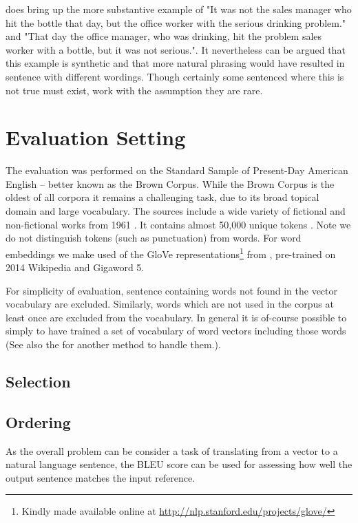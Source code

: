 \documentclass[11pt]{article}
\numberwithin{equation}{section}
\numberwithin{figure}{section}
\theoremstyle{plain}
\theoremstyle{definition}
\begin{document}
\textcite{Mitchell2008} does bring up the more substantive example of  "It was not the sales manager who  hit  the bottle that day, but the office worker with the serious drinking problem." and "That day the office manager,   who was drinking, hit the problem sales worker with a bottle, but it was not serious.". It nevertheless can be argued that this example is synthetic and that more natural phrasing would have resulted in sentence with different wordings. Though certainly some sentenced where this is not true must exist, work with the assumption they are rare.
  



\section{Evaluation Setting} \label{evalsettings}

The evaluation was performed on the  Standard Sample of Present-Day American English -- better known as the Brown Corpus. While the Brown Corpus is the oldest of all corpora it remains a challenging task, due to its broad topical domain and large vocabulary. The sources include a wide variety of fictional and non-fictional works from 1961 \parencite{francis1979brown}. It contains almost 50,000 unique tokens . Note we do not distinguish tokens (such as punctuation) from words. For word embeddings we make used of the GloVe representations\footnote{Kindly made available online at \url{http://nlp.stanford.edu/projects/glove/}} from \textcite{pennington2014glove}, pre-trained on 2014 Wikipedia and Gigaword 5. 

For simplicity of evaluation, sentence containing words not found in the vector vocabulary are excluded. Similarly, words which are not used in the corpus at least once are excluded from the vocabulary. In general it is of-course possible to simply to have trained a set of vocabulary of word vectors including those words (See also the  for another method to handle them.). 




\subsection{Selection}
\subsection{Ordering}
As the overall problem can be consider a task of translating from a vector to a natural language sentence, the BLEU  score \parencite{Papineni2002} can be used for assessing how well the output sentence matches the input reference.
\end{document}
